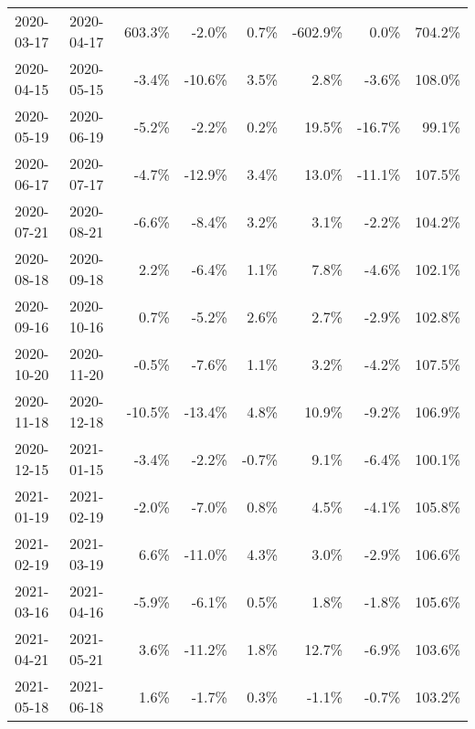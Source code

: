 \begin{tabular}{llrrrrrr}
 2020-03-17 & 2020-04-17 &   603.3\% &             -2.0\% &              0.7\% &          -602.9\% &             0.0\% &     704.2\% \\
 2020-04-15 & 2020-05-15 &    -3.4\% &            -10.6\% &              3.5\% &             2.8\% &            -3.6\% &     108.0\% \\
 2020-05-19 & 2020-06-19 &    -5.2\% &             -2.2\% &              0.2\% &            19.5\% &           -16.7\% &      99.1\% \\
 2020-06-17 & 2020-07-17 &    -4.7\% &            -12.9\% &              3.4\% &            13.0\% &           -11.1\% &     107.5\% \\
 2020-07-21 & 2020-08-21 &    -6.6\% &             -8.4\% &              3.2\% &             3.1\% &            -2.2\% &     104.2\% \\
 2020-08-18 & 2020-09-18 &     2.2\% &             -6.4\% &              1.1\% &             7.8\% &            -4.6\% &     102.1\% \\
 2020-09-16 & 2020-10-16 &     0.7\% &             -5.2\% &              2.6\% &             2.7\% &            -2.9\% &     102.8\% \\
 2020-10-20 & 2020-11-20 &    -0.5\% &             -7.6\% &              1.1\% &             3.2\% &            -4.2\% &     107.5\% \\
 2020-11-18 & 2020-12-18 &   -10.5\% &            -13.4\% &              4.8\% &            10.9\% &            -9.2\% &     106.9\% \\
 2020-12-15 & 2021-01-15 &    -3.4\% &             -2.2\% &             -0.7\% &             9.1\% &            -6.4\% &     100.1\% \\
 2021-01-19 & 2021-02-19 &    -2.0\% &             -7.0\% &              0.8\% &             4.5\% &            -4.1\% &     105.8\% \\
 2021-02-19 & 2021-03-19 &     6.6\% &            -11.0\% &              4.3\% &             3.0\% &            -2.9\% &     106.6\% \\
 2021-03-16 & 2021-04-16 &    -5.9\% &             -6.1\% &              0.5\% &             1.8\% &            -1.8\% &     105.6\% \\
 2021-04-21 & 2021-05-21 &     3.6\% &            -11.2\% &              1.8\% &            12.7\% &            -6.9\% &     103.6\% \\
 2021-05-18 & 2021-06-18 &     1.6\% &             -1.7\% &              0.3\% &            -1.1\% &            -0.7\% &     103.2\% \\
\hline
\end{tabular}